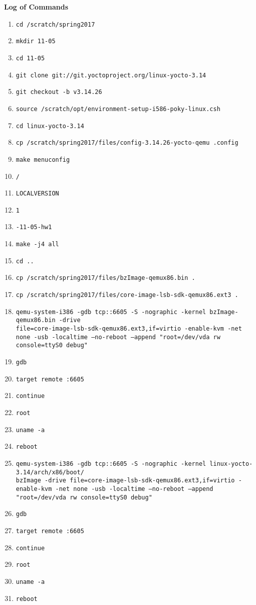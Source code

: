 \documentclass[10pt,letterpaper,draftclsnofoot,onecolumn]{IEEEtran}
\begin{document}
\noindent\textbf{Log of Commands}
\begin{enumerate}
\item \texttt{cd /scratch/spring2017}
\item \texttt{mkdir 11-05}
\item \texttt{cd 11-05}
\item \texttt{git clone git://git.yoctoproject.org/linux-yocto-3.14}
\item \texttt{git checkout -b v3.14.26}
\item \texttt{source /scratch/opt/environment-setup-i586-poky-linux.csh}
\item \texttt{cd linux-yocto-3.14}
\item \texttt{cp /scratch/spring2017/files/config-3.14.26-yocto-qemu .config}
\item \texttt{make menuconfig}
\item \texttt{/}
\item \texttt{LOCALVERSION}
\item \texttt{1}
\item \texttt{-11-05-hw1}
\item \texttt{make -j4 all}
\item \texttt{cd ..}
\item \texttt{cp /scratch/spring2017/files/bzImage-qemux86.bin .}
\item \texttt{cp /scratch/spring2017/files/core-image-lsb-sdk-qemux86.ext3 .}
\item \texttt{qemu-system-i386 -gdb tcp::6605 -S -nographic -kernel bzImage-qemux86.bin -drive\\file=core-image-lsb-sdk-qemux86.ext3,if=virtio -enable-kvm -net none -usb -localtime --no-reboot --append "root=/dev/vda rw console=ttyS0 debug"}
\item \texttt{gdb}
\item \texttt{target remote :6605}
\item \texttt{continue}
\item \texttt{root}
\item \texttt{uname -a}
\item \texttt{reboot}
\item \texttt{qemu-system-i386 -gdb tcp::6605 -S -nographic -kernel linux-yocto-3.14/arch/x86/boot/\\bzImage  -drive file=core-image-lsb-sdk-qemux86.ext3,if=virtio -enable-kvm -net none -usb -localtime --no-reboot --append "root=/dev/vda rw console=ttyS0 debug"}
\item \texttt{gdb}
\item \texttt{target remote :6605}
\item \texttt{continue}
\item \texttt{root}
\item \texttt{uname -a}
\item \texttt{reboot}
\end{enumerate}
\bigskip
\end{document}
